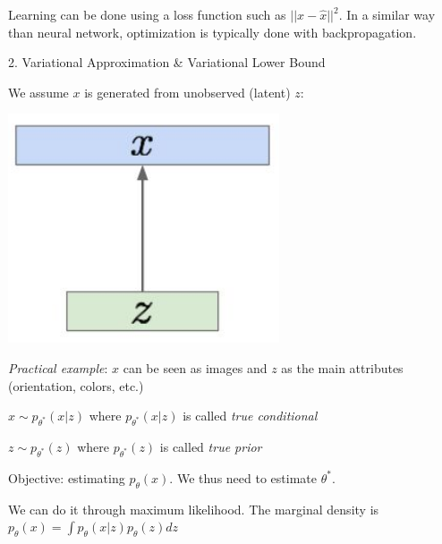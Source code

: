 \vspace{5mm}

Learning can be done using a loss function such as $||x - \widehat{x}||^2$. In a similar way than neural network, optimization is typically done with backpropagation.

\vspace{5mm}

2. Variational Approximation \& Variational Lower Bound

\vspace{5mm}

We assume $x$ is generated from unobserved (latent) $z$:

\begin{center}
\includegraphics[scale=0.3]{decoder.png}
\end{center}

\vspace{5mm}

\textit{Practical example}: $x$ can be seen as images and $z$ as the main attributes (orientation, colors, etc.)

\vspace{5mm}

$x \sim p_{\theta^*}(x | z)$ where $p_{\theta^*}(x | z)$ is called \textit{true conditional}

$z \sim p_{\theta^*}(z)$ where $p_{\theta^*}(z)$ is called \textit{true prior}

\vspace{5mm}

Objective: estimating $p_{\theta}(x)$. We thus need to estimate $\theta^*$.

\vspace{5mm}

We can do it through maximum likelihood. The marginal density is $p_{\theta}(x) = \int p_{\theta}(x|z) p_{\theta}(z) dz$

\vspace{5mm}

